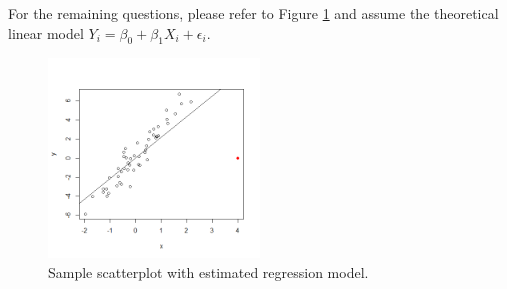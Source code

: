 \documentclass[12pt]{../notes}
\begin{document}
\begin{minipage}[l][3cm][c]{\textwidth}

\end{minipage}

For the remaining questions, please refer to Figure \ref{fig:influence} and assume the theoretical linear model $Y_i = \beta_0 + \beta_1X_i + \epsilon_i.$

\begin{figure}[H]
\centering
\includegraphics[width=0.5\textwidth]{../figures/module3/model_influence_example.png}
\caption{Sample scatterplot with estimated regression model.}
\label{fig:influence}
\end{figure}

\nspace
{}

\begin{minipage}[l][2cm][c]{\textwidth}

\end{minipage}

\nspace
{}

\begin{minipage}[l][2cm][c]{\textwidth}

\end{minipage}
\end{document}
